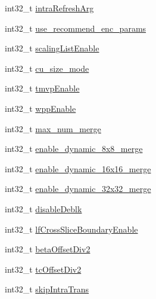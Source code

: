 \begin{DoxyCompactItemize}
int32\+\_\+t \mbox{\hyperlink{struct__ni__encoder__change__params__t_aac7eb3b757e665e9be99a2886571a556}{intra\+Refresh\+Arg}}
\item 
int32\+\_\+t \mbox{\hyperlink{struct__ni__encoder__change__params__t_a4aa8986f4bf148ab355ba99240e45053}{use\+\_\+recommend\+\_\+enc\+\_\+params}}
\item 
int32\+\_\+t \mbox{\hyperlink{struct__ni__encoder__change__params__t_a873d55ac2de5582c0ada6e56bac05b55}{scaling\+List\+Enable}}
\item 
int32\+\_\+t \mbox{\hyperlink{struct__ni__encoder__change__params__t_af6b8481b13c45b02c51831e2b53dcfdf}{cu\+\_\+size\+\_\+mode}}
\item 
int32\+\_\+t \mbox{\hyperlink{struct__ni__encoder__change__params__t_a3b1348fb2071103ae7f31807e5d73ffd}{tmvp\+Enable}}
\item 
int32\+\_\+t \mbox{\hyperlink{struct__ni__encoder__change__params__t_a869f52b6d5d81b354874776365772d9a}{wpp\+Enable}}
\item 
int32\+\_\+t \mbox{\hyperlink{struct__ni__encoder__change__params__t_a3e28a1e79bff6d88d16170c3d1006686}{max\+\_\+num\+\_\+merge}}
\item 
int32\+\_\+t \mbox{\hyperlink{struct__ni__encoder__change__params__t_a95a5812d20d3d4a02fbf31f4322ff62e}{enable\+\_\+dynamic\+\_\+8x8\+\_\+merge}}
\item 
int32\+\_\+t \mbox{\hyperlink{struct__ni__encoder__change__params__t_ac920a1f2e0c0830affc30cb7eaec9805}{enable\+\_\+dynamic\+\_\+16x16\+\_\+merge}}
\item 
int32\+\_\+t \mbox{\hyperlink{struct__ni__encoder__change__params__t_a2af2020cabdfd0b9a420075686ba0b11}{enable\+\_\+dynamic\+\_\+32x32\+\_\+merge}}
\item 
int32\+\_\+t \mbox{\hyperlink{struct__ni__encoder__change__params__t_a7c82aec867ab070248f2e6135071b680}{disable\+Deblk}}
\item 
int32\+\_\+t \mbox{\hyperlink{struct__ni__encoder__change__params__t_a5855f5f4dc4bfe206ecde7aec5359450}{lf\+Cross\+Slice\+Boundary\+Enable}}
\item 
int32\+\_\+t \mbox{\hyperlink{struct__ni__encoder__change__params__t_a4025d29cf80610df5b8debd77941bba1}{beta\+Offset\+Div2}}
\item 
int32\+\_\+t \mbox{\hyperlink{struct__ni__encoder__change__params__t_a5f2f5aa936c6d5e154457c67a8686b11}{tc\+Offset\+Div2}}
\item 
int32\+\_\+t \mbox{\hyperlink{struct__ni__encoder__change__params__t_aebe9b535ea2f741db2c160ccd68061bf}{skip\+Intra\+Trans}}

\end{DoxyCompactItemize}
